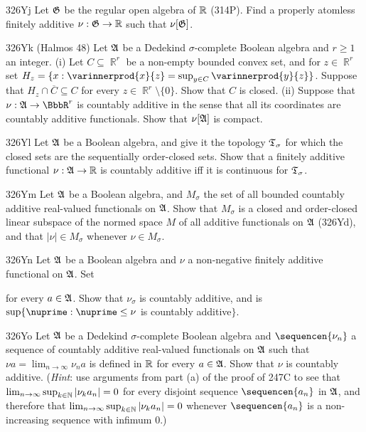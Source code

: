 {\spheader 326Yj
Let $\frak G$ be the regular open algebra of $\Bbb R$
(314P).   Find a properly atomless finitely additive
$\nu:\frak G\to\Bbb R$ such that $\nu[\frak G]$.

\spheader 326Yk ({\smc Halmos 48})
Let $\frak A$ be a Dedekind $\sigma$-complete Boolean
algebra and $r\ge 1$ an integer.   (i) Let $C\subseteq\BbbR^r$ be a
non-empty bounded convex set, and for $z\in\BbbR^r$ set
$H_z=\{x:\varinnerprod{x}{z}=\sup_{y\in C}\varinnerprod{y}{z}\}$.
Suppose that $H_z\cap\overline{C}\subseteq C$ for every
$z\in\BbbR^r\setminus\{0\}$.   Show that $C$ is closed.
(ii) Suppose that $\nu:\frak A\to\BbbR^r$ is
countably additive in the sense that all its coordinates are countably
additive functionals.   Show that $\nu[\frak A]$ is compact.

\spheader 326Yl Let $\frak A$ be a Boolean algebra, and give it
the topology $\frak T_{\sigma}$ for which the closed sets are the
sequentially order-closed sets.   Show that a finitely additive
functional $\nu:\frak A\to\Bbb R$ is countably additive iff it is
continuous for $\frak T_{\sigma}$.

\spheader 326Ym Let $\frak A$ be a Boolean algebra, and
$M_{\sigma}$ the set of all bounded countably additive real-valued
functionals on $\frak A$.   Show that $M_{\sigma}$ is a closed
and order-closed linear subspace of the normed space $M$ of all additive
functionals on $\frak A$ (326Yd), and that $|\nu|\in M_{\sigma}$
whenever $\nu\in M_{\sigma}$.

\spheader 326Yn Let $\frak A$ be a Boolean algebra and $\nu$ a
non-negative finitely additive functional on $\frak A$.   Set


\noindent for every $a\in\frak A$.   Show that $\nu_{\sigma}$ is
countably additive, and is $\sup\{\nuprime:\nuprime\le\nu$ is countably
additive$\}$.

\spheader 326Yo Let $\frak A$ be a Dedekind
$\sigma$-complete Boolean algebra and $\sequencen{\nu_n}$ a sequence of
countably additive real-valued functionals on $\frak A$ such that
$\nu a=\lim_{n\to\infty}\nu_na$ is defined in $\Bbb R$ for every
$a\in\frak A$.   Show that $\nu$ is countably additive.   ({\it Hint\/}:
use arguments from part (a) of the proof of 247C to see that
$\lim_{n\to\infty}\sup_{k\in\Bbb N}|\nu_ka_n|=0$ for every disjoint
sequence $\sequencen{a_n}$ in $\frak A$, and therefore that
$\lim_{n\to\infty}\sup_{k\in\Bbb N}|\nu_ka_n|=0$ whenever
$\sequencen{a_n}$ is a non-increasing sequence with infimum $0$.)

}
